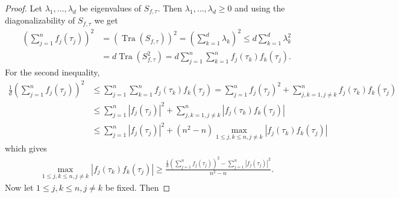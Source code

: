 \documentclass[10pt,a4paper]{amsart}
\begin{document}
  \begin{proof}
  	Let $\lambda_1, \dots, \lambda_d$ be eigenvalues of $	S_{f, \tau}$. Then $\lambda_1, \dots, \lambda_d\geq0$ and using the diagonalizability of $	S_{f, \tau}$  we get 
  	\begin{align}\label{INTERMEDIATE}
  \left(\sum_{j=1}^n
  f_j(\tau_j)\right)^2&=	(\operatorname{Tra}(S_{f,\tau}))^2=\left(\sum_{k=1}^d
  \lambda_k\right)^2\leq d \sum_{k=1}^d
  \lambda_k^2 \nonumber\\
  &=d\operatorname{Tra}(S^2_{f,\tau})=d\sum_{j=1}^n\sum_{k=1}^nf_j(\tau_k)f_k(\tau_j).
  	\end{align}
 For the second inequality,  
   \begin{align*}
  \frac{1}{d} \left(\sum_{j=1}^n
  f_j(\tau_j)\right)^2&\leq \sum_{j=1}^n\sum_{k=1}^nf_j(\tau_k)f_k(\tau_j)=\sum_{j=1}^nf_j(\tau_j)^2+\sum_{j,k=1, j\neq k}^nf_j(\tau_k)f_k(\tau_j)\\
  &\leq \sum_{j=1}^n|f_j(\tau_j)|^2+\sum_{j,k=1, j\neq k}^n|f_j(\tau_k)f_k(\tau_j)|\\
  &\leq \sum_{j=1}^n|f_j(\tau_j)|^2+ (n^2-n)\max _{1\leq j,k \leq n, j\neq k}|f_j(\tau_k)f_k(\tau_j)|
  \end{align*}	
  which gives 
  \begin{align}\label{PROOFFIRST}
  \max _{1\leq j,k \leq n, j\neq k}|f_j(\tau_k)f_k(\tau_j)|\geq \frac{\frac{1}{d}	\left(\sum_{j=1}^n
  	f_j(\tau_j)\right)^2-	\sum_{j=1}^n
  	|f_j(\tau_j)|^2}{n^2-n}.
  \end{align}
  Now let $1\leq j,k \leq n, j\neq k$ be fixed. Then 
  

\end{proof}
\end{document}
